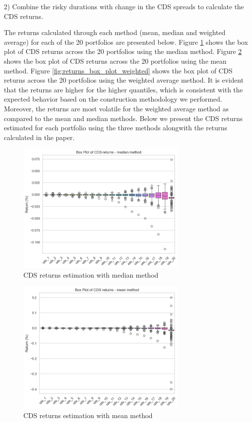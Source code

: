 \documentclass{article}
\begin{document}
2) Combine the risky durations with change in the CDS spreads to calculate the CDS returns. 

The returns calculated through each method (mean, median and weighted average) for each of the 20 portfolios are presented below.  
Figure \ref{fig:returns_box_plot_median} shows the box plot of CDS returns across the 20 portfolios using the median method. Figure \ref{fig:returns_box_plot_mean} shows the box plot of CDS returns across the 20 portfolios using the mean method. Figure \ref{fig:returns_box_plot_weighted} shows the box plot of CDS returns across the 20 portfolios using the weighted average method. It is evident that the returns are higher for the higher quantiles, which is consistent with the expected behavior based on the construction methodology we performed. Moreover, the returns are most volatile for the weighted average method as compared to the mean and median methods.
Below we present the CDS returns estimated for each portfolio using the three methods alongwith the returns calculated in the paper.
\begin{figure}[H]
    \centering
    \includegraphics[width=0.75\textwidth]{../assets/cds_returns_boxplot_median.png}
    \caption{\label{fig:returns_box_plot_median}CDS returns estimation with median method}
    \end{figure}

\begin{figure}[H]
    \centering
    \includegraphics[width=0.75\textwidth]{../assets/cds_returns_boxplot_allportfolios.png}
    \caption{\label{fig:returns_box_plot_mean}CDS returns estimation with mean method}
    \end{figure}   
\end{document}
